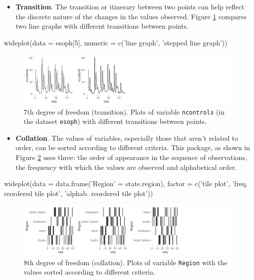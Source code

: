 \begin{itemize}
	\tightlist
	\item
	\textbf{Transition}. The transition or itinerary between two points
	can help reflect the discrete nature of the changes in the values
	observed. Figure \ref{fig:dg6} compares two line graphs with different
	transitions between points.
\end{itemize}

\begin{example}
  wideplot(data = esoph[5], 
           numeric = c('line graph', 'stepped line graph'))
\end{example}

\begin{Schunk}
	\begin{figure}[H]
\includegraphics[width=1\linewidth]{figures/dg6-1} \caption[7th deg]{7th degree of freedom (transition). Plots of variable \texttt{ncontrols} (in the dataset \texttt{esoph}) with different transitions between points.}\label{fig:dg6}
	\end{figure}
\end{Schunk}

\begin{itemize}
	\tightlist
	\item
	\textbf{Collation}. The values of variables, especially those that
	aren't related to order, can be sorted according to different
	criteria. This package, as shown in Figure \ref{fig:dg7} uses three:
	the order of appearance in the sequence of observations, the frequency
	with which the values are observed and alphabetical order.
\end{itemize}

\begin{example}
  wideplot(data = data.frame('Region' = state.region),
           factor = c('tile plot',
                      'freq. reordered tile plot',
                      'alphab. reordered tile plot'))
\end{example}


\begin{Schunk}
	\begin{figure}[H]
\includegraphics[width=1\linewidth]{figures/dg7-1} \caption[8th deg]{8th degree of freedom (collation). Plots of variable \texttt{Region} with the values sorted according to different criteria.}\label{fig:dg7}
	\end{figure}
\end{Schunk}

